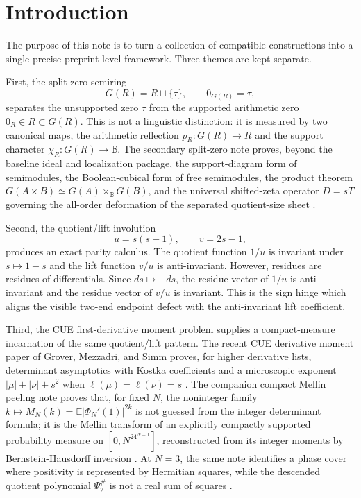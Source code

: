 \documentclass[11pt]{article}
\newcommand{\B}{\mathbb B}
\begin{document}
\tableofcontents

\section{Introduction}

The purpose of this note is to turn a collection of compatible constructions into a
single precise preprint-level framework.  Three themes are kept separate.

First, the split-zero semiring
\[
G(R)=R\sqcup\{\tau\},\qquad 0_{G(R)}=\tau,
\]
separates the unsupported zero $\tau$ from the supported arithmetic zero
$0_R\in R\subset G(R)$.  This is not a linguistic distinction: it is measured by two
canonical maps, the arithmetic reflection $p_R:G(R)\to R$ and the support
character $\chi_R:G(R)\to\B$.  The secondary split-zero note proves, beyond the
baseline ideal and localization package, the support-diagram form of semimodules,
the Boolean-cubical form of free semimodules, the product theorem
$G(A\times B)\simeq G(A)\times_{\B}G(B)$, and the universal shifted-zeta operator
$D=sT$ governing the all-order deformation of the separated quotient-size sheet
\cite{SZ2}.

Second, the quotient/lift involution
\[
 u=s(s-1),\qquad v=2s-1,
\]
produces an exact parity calculus.  The quotient function $1/u$ is invariant under
$s\mapsto 1-s$ and the lift function $v/u$ is anti-invariant.  However, residues are
residues of differentials.  Since $ds\mapsto -ds$, the residue vector of $1/u$ is
anti-invariant and the residue vector of $v/u$ is invariant.  This is the sign hinge
which aligns the visible two-end endpoint defect with the anti-invariant lift
coefficient.

Third, the CUE first-derivative moment problem supplies a compact-measure
incarnation of the same quotient/lift pattern.  The recent CUE derivative moment
paper of Grover, Mezzadri, and Simm proves, for higher derivative lists, determinant
asymptotics with Kostka coefficients and a microscopic exponent
$|\mu|+|\nu|+s^2$ when $\ell(\mu)=\ell(\nu)=s$ \cite{GMS}.  The companion
compact Mellin peeling note proves that, for fixed $N$, the noninteger family
$k\mapsto M_N(k)=\mathbb E|\Phi_N'(1)|^{2k}$ is not guessed from the integer
determinant formula; it is the Mellin transform of an explicitly compactly
supported probability measure on $[0,N^24^{N-1}]$, reconstructed from its integer
moments by Bernstein-Hausdorff inversion \cite{CMP}.  At $N=3$, the same note
identifies a phase cover where positivity is represented by Hermitian squares, while
the descended quotient polynomial $\Psi_2^\#$ is not a real sum of squares
\cite{CMP}.
\end{document}
